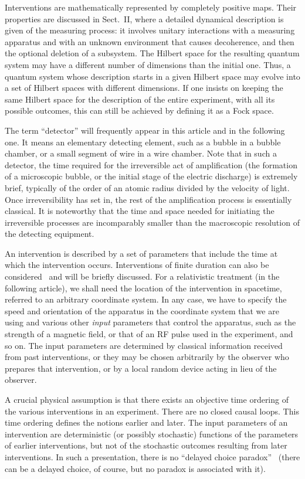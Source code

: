 \documentclass[12pt]{article}
\begin{document}
Interventions are mathematically represented by completely positive
maps. Their properties are discussed in Sect.~II, where a detailed
dynamical description is given of the measuring process: it involves
unitary interactions with a measuring apparatus and with an unknown
environment that causes decoherence, and then the optional deletion of a
subsystem. The Hilbert space for the resulting quantum system may have a
different number of dimensions than the initial one. Thus, a quantum
system whose description starts in a given Hilbert space may evolve into
a set of Hilbert spaces with different dimensions. If one insists on
keeping the same Hilbert space for the description of the entire
experiment, with all its possible outcomes, this can still be achieved
by defining it as a Fock space.

The term ``detector'' will frequently appear in this article and in the
following one. It means an elementary detecting element, such as a
bubble in a bubble chamber, or a small segment of wire in a wire
chamber. Note that in such a detector, the time required for the
irreversible act of amplification (the formation of a microscopic
bubble, or the initial stage of the electric discharge) is extremely
brief, typically of the order of an atomic radius divided by the
velocity of light. Once irreversibility has set in, the rest of the
amplification process is essentially classical. It is noteworthy that
the time and space needed for initiating the irreversible processes are
incomparably smaller than the macroscopic resolution of the detecting
equipment.

An intervention is described by a set of parameters that include the
time at which the intervention occurs. Interventions of finite duration
can also be considered~\cite{PW85} and will be briefly discussed. For
a relativistic treatment (in the following article), we shall need the
location of the intervention in spacetime, referred to an arbitrary
coordinate system. In any case, we have to specify the speed and
orientation of the apparatus in the coordinate system that we are using
and various other {\it input\/} parameters that control the apparatus,
such as the strength of a magnetic field, or that of an RF pulse used in
the experiment, and so on. The input parameters are determined by
classical information received from past interventions, or they may be
chosen arbitrarily by the observer who prepares that intervention, or by
a local random device acting in lieu of the observer.

A crucial physical assumption is that there exists an objective time
ordering of the various interventions in an experiment. There are no
closed causal loops. This time ordering defines the notions earlier and
later. The input parameters of an intervention are deterministic (or
possibly stochastic) functions of the parameters of earlier
interventions, but not of the stochastic outcomes resulting from later
interventions. In such a presentation, there is no ``delayed choice
paradox''~\cite{delayed} (there can be a delayed choice, of course, but
no paradox is associated with it).
\end{document}
